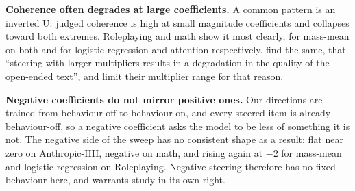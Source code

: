 \textbf{Coherence often degrades at large coefficients.} A common pattern
is an inverted U: judged coherence is high at small magnitude coefficients and
collapses toward both extremes. Roleplaying and math show it most clearly,
for mass-mean on both and for logistic regression and attention
respectively. \citeauthor{rimsky2024} find the same, that ``steering with
larger multipliers results in a degradation in the quality of the
open-ended text'', and limit their multiplier range for that reason.

\textbf{Negative coefficients do not mirror positive ones.} Our directions
are trained from behaviour-off to behaviour-on, and every steered item is
already behaviour-off, so a negative coefficient asks the model to be less
of something it is not. The negative side of the sweep has no consistent
shape as a result: flat near zero on Anthropic-HH, negative on math, and
rising again at $-2$ for mass-mean and logistic regression on Roleplaying.
Negative steering therefore has no fixed behaviour here, and warrants
study in its own right.


